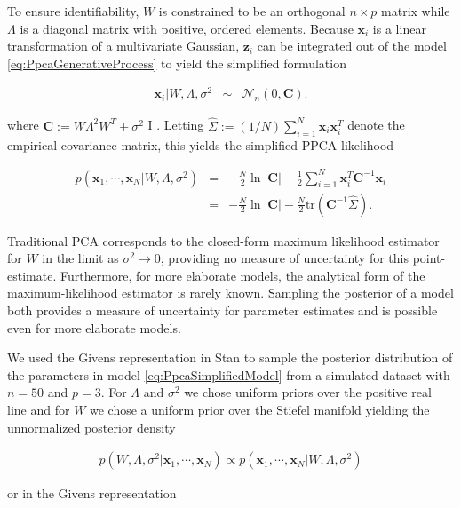 \documentclass[ba]{imsart}
\newcommand{\mb}[1]{\mathbf{#1}}
\numberwithin{equation}{section}
\theoremstyle{plain}
\begin{document}
\noindent To ensure identifiability, $W$ is constrained to be an orthogonal $n \times p$ matrix while $\Lambda$ is a diagonal matrix with positive, ordered elements. Because $\mb{x}_i$ is a linear transformation of a multivariate Gaussian, $\mb{z}_i$ can be integrated out of the model \ref{eq:PpcaGenerativeProcess} to yield the simplified formulation

\begin{eqnarray}
\label{eq:PpcaSimplifiedModel}
\mb{x}_i | W, \Lambda, \sigma^2 &\sim& \mathcal{N}_n(0, \textbf{C}).
\end{eqnarray}

\noindent where $\textbf{C} := W \Lambda^2 W^T + \sigma^2$ I \citep{murphy2012machine}. Letting $\hat{\Sigma} := (1/N) \sum_{i=1}^N \mb{x}_i \mb{x}_i^T$ denote the empirical covariance matrix, this yields the simplified PPCA likelihood

\begin{eqnarray}
p(\mb{x}_1, \cdots, \mb{x}_N | W, \Lambda, \sigma^2) &=& -\frac{N}{2} \ln |\textbf{C}| - \frac{1}{2} \sum_{i=1}^N \mb{x}_i^T \textbf{C}^{-1} \mb{x}_i\\
&=& -\frac{N}{2} \ln |\textbf{C}| - \frac{N}{2} \mathrm{tr} (\textbf{C}^{-1} \hat{\Sigma}).
\label{eq:ppca_likelihood}
\end{eqnarray}

\noindent Traditional PCA corresponds to the closed-form maximum likelihood estimator for $W$ in the limit as $\sigma^2 \to 0$,  providing no measure of uncertainty for this point-estimate. Furthermore, for more elaborate models, the analytical form of the maximum-likelihood estimator is rarely known. Sampling the posterior of a model both provides a measure of uncertainty for parameter estimates and is possible even for more elaborate models.

\noindent We used the Givens representation in Stan to sample the posterior distribution of the parameters in model \ref{eq:PpcaSimplifiedModel} from a simulated dataset with $n = 50$ and $p = 3$. For  $\Lambda$ and $\sigma^2$ we chose uniform priors over the positive real line and for $W$ we chose a uniform prior over the Stiefel manifold yielding the unnormalized posterior density

\begin{eqnarray}
p(W, \Lambda, \sigma^2 | \mb{x}_1, \cdots, \mb{x}_N) \propto p(\mb{x}_1, \cdots, \mb{x}_N | W, \Lambda, \sigma^2)
\end{eqnarray}

\noindent or in the Givens representation
\end{document}
